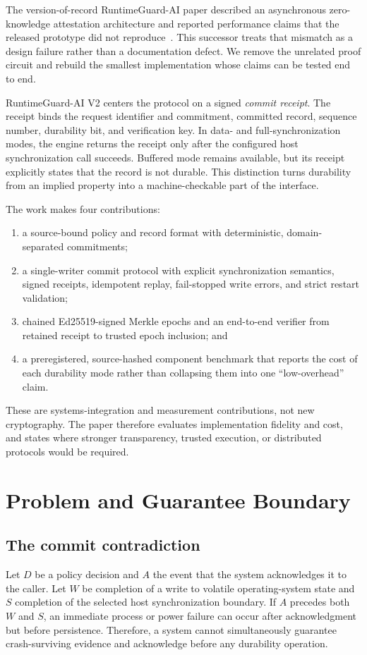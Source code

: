 \documentclass[10pt,twocolumn]{article}
\newcommand{\system}{RuntimeGuard-AI V2}
\begin{document}
The version-of-record RuntimeGuard-AI paper described an asynchronous zero-knowledge attestation architecture and reported performance claims that the released prototype did not reproduce~\cite{runtimeguard_vor}. This successor treats that mismatch as a design failure rather than a documentation defect. We remove the unrelated proof circuit and rebuild the smallest implementation whose claims can be tested end to end.

\system{} centers the protocol on a signed \emph{commit receipt}. The receipt binds the request identifier and commitment, committed record, sequence number, durability bit, and verification key. In data- and full-synchronization modes, the engine returns the receipt only after the configured host synchronization call succeeds. Buffered mode remains available, but its receipt explicitly states that the record is not durable. This distinction turns durability from an implied property into a machine-checkable part of the interface.

The work makes four contributions:
\begin{enumerate}
  \item a source-bound policy and record format with deterministic, domain-separated commitments;
  \item a single-writer commit protocol with explicit synchronization semantics, signed receipts, idempotent replay, fail-stopped write errors, and strict restart validation;
  \item chained Ed25519-signed Merkle epochs and an end-to-end verifier from retained receipt to trusted epoch inclusion; and
  \item a preregistered, source-hashed component benchmark that reports the cost of each durability mode rather than collapsing them into one ``low-overhead'' claim.
\end{enumerate}

These are systems-integration and measurement contributions, not new cryptography. The paper therefore evaluates implementation fidelity and cost, and states where stronger transparency, trusted execution, or distributed protocols would be required.

\section{Problem and Guarantee Boundary}
\subsection{The commit contradiction}
Let $D$ be a policy decision and $A$ the event that the system acknowledges it to the caller. Let $W$ be completion of a write to volatile operating-system state and $S$ completion of the selected host synchronization boundary. If $A$ precedes both $W$ and $S$, an immediate process or power failure can occur after acknowledgment but before persistence. Therefore, a system cannot simultaneously guarantee crash-surviving evidence and acknowledge before any durability operation.
\end{document}
